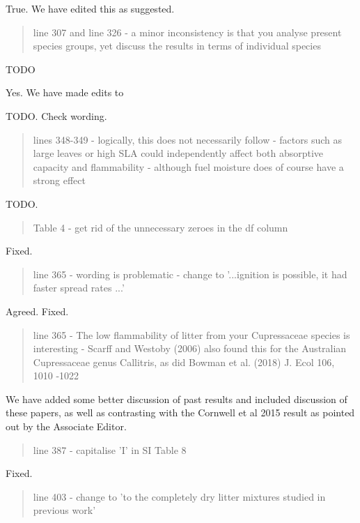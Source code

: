 \documentclass[letterpaper, 12pt]{letter}
\begin{document}
\begin{letter}{}
True. We have edited this as suggested.

\begin{quote}
line 307 and line 326 - a minor inconsistency is that you analyse present species groups, yet discuss the results in terms of individual species
\end{quote}

TODO

Yes. We have made edits to

TODO. Check wording.



\begin{quote}
lines 348-349 - logically, this does not necessarily follow - factors such as large leaves or high SLA could independently affect both absorptive capacity and flammability - although fuel moisture does of course have a strong effect 
\end{quote}

TODO.


\begin{quote}
Table 4 - get rid of the unnecessary zeroes in the df column
\end{quote}

Fixed.

\begin{quote}
line 365 - wording is problematic - change to '...ignition is possible, it had faster spread rates ...'
\end{quote}

Agreed. Fixed.

\begin{quote}
line 365 - The low flammability of litter from your Cupressaceae species is interesting - Scarff and Westoby (2006) also found this for the Australian Cupressaceae genus Callitris, as did Bowman et al. (2018) J. Ecol 106, 1010 -1022
\end{quote}

We have added some better discussion of past results and included discussion of these papers, as well as contrasting with the Cornwell et al 2015 result as pointed out by the Associate Editor.

\begin{quote}
line 387 - capitalise 'I' in SI Table  8
\end{quote}

Fixed.

\begin{quote}
line 403 - change to 'to the completely dry litter mixtures studied in previous work'
\end{quote}


\end{letter}
\end{document}
